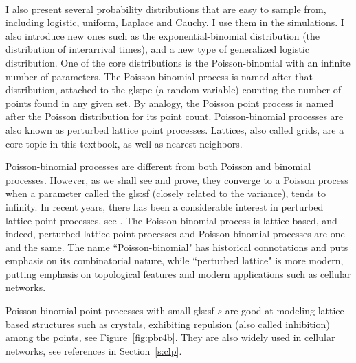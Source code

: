\documentclass[10pt]{article}
\begin{document}
\quad \\

I also present several probability distributions that are easy to sample from, including logistic, uniform, Laplace and Cauchy. I use them in the simulations. I also introduce new ones  such as the \textcolor{index}{exponential-binomial distribution} (the distribution of interarrival times), and a new type of \textcolor{index}{generalized logistic distribution}. One of the core distributions is the \textcolor{index}{Poisson-binomial} with an infinite number of parameters. The Poisson-binomial process is named after that distribution, attached to the
\gls{gls:pc} (a random variable) counting the number of points found in any given set. By analogy, the Poisson point process is named after the Poisson distribution for its point count. Poisson-binomial processes are also known as \textcolor{index}{perturbed lattice point processes}.
Lattices, also called \textcolor{index}{grids}, are a core topic in this textbook, as well as \textcolor{index}{nearest neighbors}.

Poisson-binomial processes are different from both Poisson and \textcolor{index}{binomial processes}. However, as we shall see and prove, they converge to a \textcolor{index}{Poisson process} when a parameter called the \gls{gls:sf} (closely related to the variance), tends to infinity. In recent years, there has been a considerable interest in perturbed lattice point processes, see \cite{ghosh2020,poi103}. The \textcolor{index}{Poisson-binomial process} is lattice-based, and indeed, \textcolor{index}{perturbed lattice point processes} and Poisson-binomial processes are one and the same. The name ``Poisson-binomial" has historical connotations and puts emphasis on its combinatorial nature, while ``perturbed lattice" is more modern, putting emphasis on topological features and modern applications such as cellular networks.

Poisson-binomial point processes with small \gls{gls:sf} $s$ are good at modeling lattice-based structures such as crystals, exhibiting \textcolor{index}{repulsion} (also called \textcolor{index}{inhibition}) among the points, see Figure~\ref{fig:pbr4b}.  They are also widely used in cellular networks, see references in Section~\ref{s:clp}.
\end{document}
